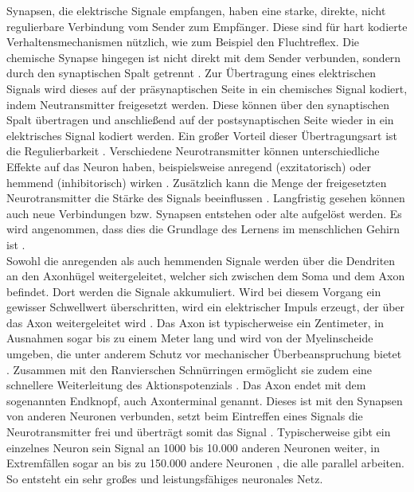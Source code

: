 Synapsen, die elektrische Signale empfangen, haben eine starke, direkte, nicht regulierbare Verbindung vom Sender zum Empfänger. Diese sind für hart kodierte Verhaltensmechanismen nützlich, wie zum Beispiel den Fluchtreflex. Die chemische Synapse hingegen ist nicht direkt mit dem Sender verbunden, sondern durch den synaptischen Spalt getrennt \cite{kriesel2008kleiner}. Zur Übertragung eines elektrischen Signals wird dieses auf der präsynaptischen Seite in ein chemisches Signal kodiert, indem Neutransmitter freigesetzt werden. Diese können über den synaptischen Spalt übertragen und anschließend auf der postsynaptischen Seite wieder in ein elektrisches Signal kodiert werden. Ein großer Vorteil dieser Übertragungsart ist die Regulierbarkeit \cite{kriesel2008kleiner}. Verschiedene Neurotransmitter können unterschiedliche Effekte auf das Neuron haben, beispielsweise anregend (exzitatorisch) oder hemmend (inhibitorisch) wirken \cite{kirschbaum2008biopsychologie}. Zusätzlich kann die Menge der freigesetzten Neurotransmitter die Stärke des Signals beeinflussen \cite{kriesel2008kleiner}. Langfristig gesehen können auch neue Verbindungen bzw. Synapsen entstehen oder alte aufgelöst werden. Es wird angenommen, dass dies die Grundlage des Lernens im menschlichen Gehirn ist \cite{russell2013kunstliche}.\\
Sowohl die anregenden als auch hemmenden Signale werden über die Dendriten an den Axonhügel weitergeleitet, welcher sich zwischen dem Soma und dem Axon befindet. Dort werden die Signale akkumuliert. Wird bei diesem Vorgang ein gewisser Schwellwert überschritten, wird ein elektrischer Impuls erzeugt, der über das Axon weitergeleitet wird \cite{kirschbaum2008biopsychologie}. Das Axon ist typischerweise ein Zentimeter, in Ausnahmen sogar bis zu einem Meter lang und wird von der Myelinscheide umgeben, die unter anderem Schutz vor mechanischer Überbeanspruchung bietet \cite{russell2013kunstliche}. Zusammen mit den Ranvierschen Schnürringen ermöglicht sie zudem eine schnellere Weiterleitung des Aktionspotenzials \cite{kirschbaum2008biopsychologie}. Das Axon endet mit dem sogenannten Endknopf, auch Axonterminal genannt. Dieses ist mit den Synapsen von anderen Neuronen verbunden, setzt beim Eintreffen eines Signals die Neurotransmitter frei und überträgt somit das Signal \cite{kirschbaum2008biopsychologie}. Typischerweise gibt ein einzelnes Neuron sein Signal an 1000 bis 10.000 anderen Neuronen weiter, in Extremfällen sogar an bis zu 150.000 andere Neuronen \cite{zell2003simulation}, die alle parallel arbeiten. So entsteht ein sehr großes und leistungsfähiges neuronales Netz. 

